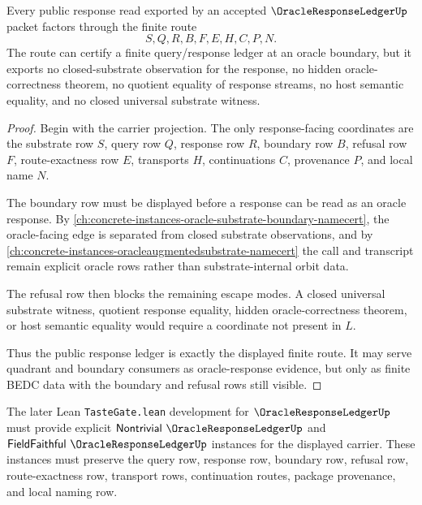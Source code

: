 \begin{theorem}
\label{thm:oracle-response-ledger-boundary-nonescape}
Every public response read exported by an accepted
$\OracleResponseLedgerUp$ packet factors through the finite route
$$
S,Q,R,B,F,E,H,C,P,N .
$$
The route can certify a finite query/response ledger at an oracle boundary,
but it exports no closed-substrate observation for the response, no hidden
oracle-correctness theorem, no quotient equality of response streams, no host
semantic equality, and no closed universal substrate witness.
\end{theorem}
\begin{proof}
Begin with the carrier projection. The only response-facing coordinates are
the substrate row $S$, query row $Q$, response row $R$, boundary row $B$,
refusal row $F$, route-exactness row $E$, transports $H$, continuations $C$,
provenance $P$, and local name $N$.

The boundary row must be displayed before a response can be read as an oracle
response. By \autoref{ch:concrete-instances-oracle-substrate-boundary-namecert},
the oracle-facing edge is separated from closed substrate observations, and by
\autoref{ch:concrete-instances-oracleaugmentedsubstrate-namecert} the call and
transcript remain explicit oracle rows rather than substrate-internal orbit
data.

The refusal row then blocks the remaining escape modes. A closed universal
substrate witness, quotient response equality, hidden oracle-correctness
theorem, or host semantic equality would require a coordinate not present in
$L$.

Thus the public response ledger is exactly the displayed finite route. It may
serve quadrant and boundary consumers as oracle-response evidence, but only as
finite BEDC data with the boundary and refusal rows still visible.
\end{proof}

The later Lean \texttt{TasteGate.lean} development for
$\OracleResponseLedgerUp$ must provide explicit
$\mathsf{Nontrivial}\ \OracleResponseLedgerUp$ and
$\mathsf{FieldFaithful}\ \OracleResponseLedgerUp$ instances for the displayed
carrier. These instances must preserve the query row, response row, boundary
row, refusal row, route-exactness row, transport rows, continuation routes,
package provenance, and local naming row.


